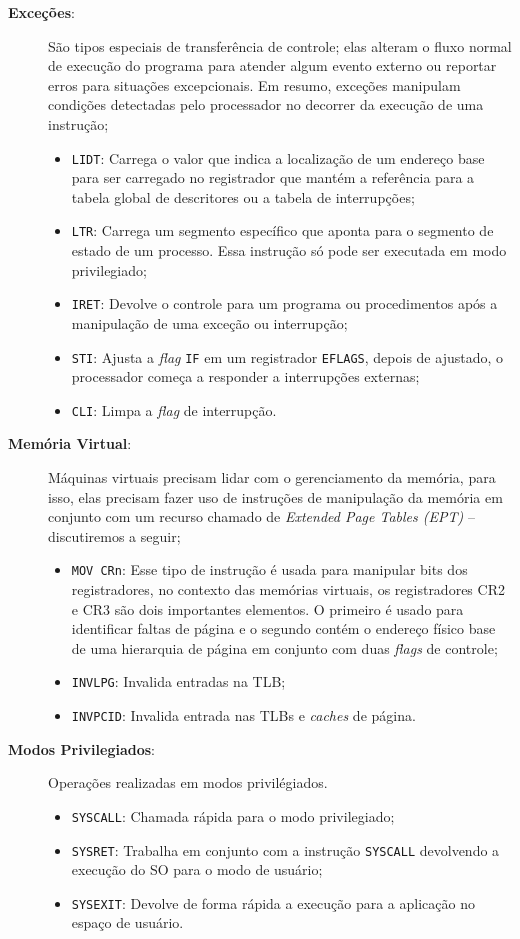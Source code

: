 \begin{description}
	\item [\textbf{Exceções}:] São tipos especiais de transferência de
controle; elas alteram o fluxo normal de execução do programa para atender
algum evento externo ou reportar erros para situações excepcionais. Em resumo,
exceções manipulam condições detectadas pelo processador no decorrer da
execução de uma instrução;
		\begin{itemize}
			\item \texttt{LIDT}: Carrega o valor que indica a localização de um
endereço base para ser carregado no registrador que mantém a referência para a
tabela global de descritores ou a tabela de interrupções;
			\item \texttt{LTR}: Carrega um segmento específico que aponta para o
segmento de estado de um processo. Essa instrução só pode ser executada em modo
privilegiado;
			\item \texttt{IRET}: Devolve o controle para um programa ou procedimentos
após a manipulação de uma exceção ou interrupção;
			\item \texttt{STI}: Ajusta a \emph{flag} \texttt{IF} em um registrador
\texttt{EFLAGS}, depois de ajustado, o processador começa a responder a
interrupções externas;
			\item \texttt{CLI}: Limpa a \emph{flag} de interrupção.
		\end{itemize}
  \item [\textbf{Memória Virtual}:]
Máquinas virtuais precisam lidar com o gerenciamento da memória, para isso,
elas precisam fazer uso de instruções de manipulação da memória em conjunto com
um recurso chamado de \emph{Extended Page Tables (EPT)} -- discutiremos a seguir;
		\begin{itemize}
			\item \texttt{MOV CRn}: Esse tipo de instrução é usada para manipular
bits dos registradores, no contexto das memórias virtuais, os registradores CR2
e CR3 são dois importantes elementos. O primeiro é usado para identificar
faltas de página e o segundo contém o endereço físico base de uma hierarquia de
página em conjunto com duas \emph{flags} de controle;
			\item \texttt{INVLPG}: Invalida entradas na TLB;
			\item \texttt{INVPCID}: Invalida entrada nas TLBs e \emph{caches} de
página.
		\end{itemize}
	\item [\textbf{Modos Privilegiados}:] Operações realizadas em modos
privilégiados.
		\begin{itemize}
			\item \texttt{SYSCALL}: Chamada rápida para o modo privilegiado;
			\item \texttt{SYSRET}: Trabalha em conjunto com a instrução
\texttt{SYSCALL} devolvendo a execução do SO para o modo de usuário;
			\item \texttt{SYSEXIT}: Devolve de forma rápida a execução para a
aplicação no espaço de usuário.
		\end{itemize}
\end{description}

